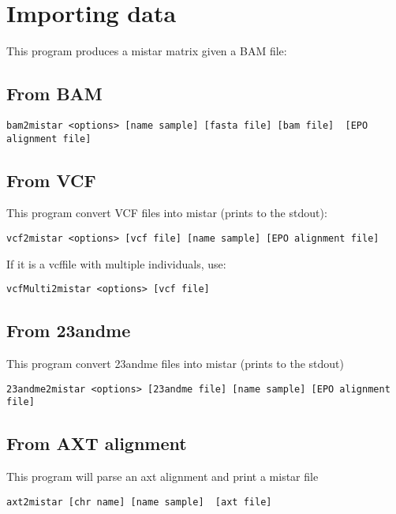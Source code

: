 \documentclass[a4paper]{article}
\begin{document}
\section{Importing data}

This program produces a  mistar matrix given a BAM file:

\subsection{From BAM}

\small
\begin{verbatim} 
bam2mistar <options> [name sample] [fasta file] [bam file]  [EPO alignment file]
\end{verbatim} 
\normalsize

\subsection{From VCF}

This program convert VCF files into mistar (prints to the stdout):

\begin{verbatim}
vcf2mistar <options> [vcf file] [name sample] [EPO alignment file]
\end{verbatim}

If it is a vcffile with multiple individuals, use:
\begin{verbatim}
vcfMulti2mistar <options> [vcf file]
\end{verbatim}

\subsection{From 23andme}

This program convert 23andme files into mistar (prints to the stdout)

\begin{verbatim}
23andme2mistar <options> [23andme file] [name sample] [EPO alignment file]
\end{verbatim}

\subsection{From AXT alignment}

This program will parse an axt alignment and print a mistar file

\begin{verbatim}
axt2mistar [chr name] [name sample]  [axt file]
\end{verbatim}
\end{document}
